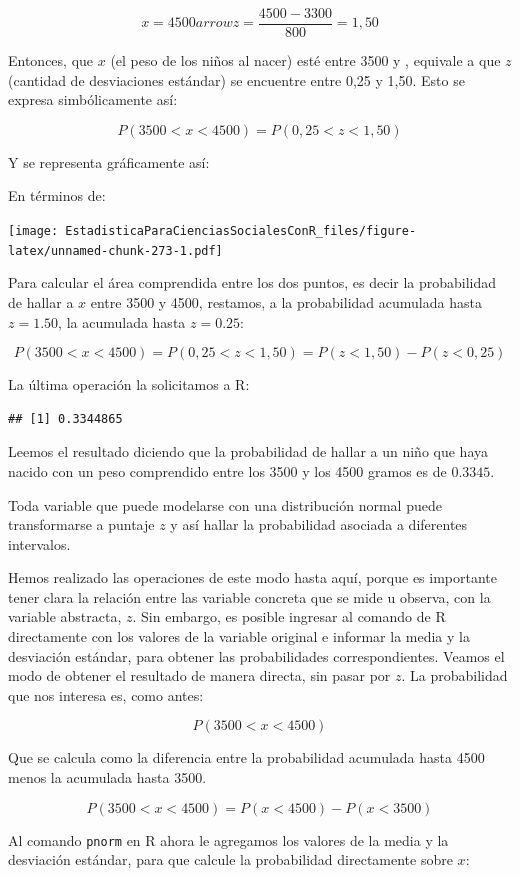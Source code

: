 \documentclass[]{book}
\begin{document}
\[x = 4500arrow z = \frac{4500 - 3300}{800} = 1,50\]

Entonces, que \(x\) (el peso de los niños al nacer) esté entre 3500 y ,
equivale a que \(z\) (cantidad de desviaciones estándar) se encuentre
entre 0,25 y 1,50. Esto se expresa simbólicamente así:

\[P(3500 < x < 4500) = P(0,25 < z < 1,50)\]

Y se representa gráficamente así:

En términos de:

\texttt{[image: EstadisticaParaCienciasSocialesConR\_files/figure-latex/unnamed-chunk-273-1.pdf]}

Para calcular el área comprendida entre los dos puntos, es decir la
probabilidad de hallar a \(x\) entre 3500 y 4500, restamos, a la
probabilidad acumulada hasta \(z=1.50\), la acumulada hasta \(z=0.25\):

\[P(3500 < x < 4500) = P(0,25 < z < 1,50) = P(z < 1,50) - P(z < 0,25)\]

La última operación la solicitamos a R:

\begin{verbatim}
## [1] 0.3344865
\end{verbatim}

Leemos el resultado diciendo que la probabilidad de hallar a un niño que haya nacido con un peso comprendido entre los 3500 y los 4500 gramos es de \(0.3345\).

Toda variable que puede modelarse con una distribución normal puede
transformarse a puntaje \(z\) y así hallar la probabilidad asociada a
diferentes intervalos.

Hemos realizado las operaciones de este modo hasta aquí, porque es importante tener clara la relación entre las variable concreta que se mide u observa, con la variable abstracta, \(z\). Sin embargo, es posible ingresar al comando de R directamente con los valores de la variable original e informar la media y la desviación estándar, para obtener las probabilidades correspondientes. Veamos el modo de obtener el resultado de manera directa, sin pasar por \(z\). La
probabilidad que nos interesa es, como antes:

\[P(3500 < x < 4500)\]

Que se calcula como la diferencia entre la probabilidad acumulada hasta
4500 menos la acumulada hasta 3500.

\[P(3500 < x < 4500) = P(x < 4500) - P(x < 3500)\]

Al comando \texttt{pnorm} en R ahora le agregamos los valores de la media y la desviación estándar, para que calcule la probabilidad directamente sobre \(x\):
\end{document}
